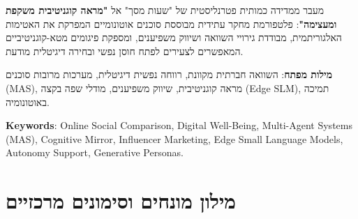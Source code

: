 \begin{objectivebox}
מעבר ממדידה כמותית פטרנליסטית של "שעות מסך" אל \textbf{"מראה קוגניטיבית משקפת ומעצימה"}:
פלטפורמת מחקר עתידית מבוססת סוכנים אוטונומיים המפרקת את האטימות האלגוריתמית, מבודדת גירויי השוואה ושיווק משפיענים, ומספקת פיגומים מטא-קוגניטיביים המאפשרים לצעירים לפתח חוסן נפשי ובחירה דיגיטלית מודעת.
\end{objectivebox}

\noindent
\textbf{\color{DarkPurple}מילות מפתח}: השוואה חברתית מקוונת, רווחה נפשית דיגיטלית, מערכות מרובות סוכנים (\textenglish{MAS}), מראה קוגניטיבית, שיווק משפיענים, מודלי שפה בקצה (\textenglish{Edge SLM}), תמיכה באוטונומיה.

\vspace{0.15cm}
\noindent
\textbf{\color{DarkPurple}\textenglish{Keywords}}: \textenglish{Online Social Comparison, Digital Well-Being, Multi-Agent Systems (MAS), Cognitive Mirror, Influencer Marketing, Edge Small Language Models, Autonomy Support, Generative Personas.}

\newpage

\section*{מילון מונחים וסימונים מרכזיים}

